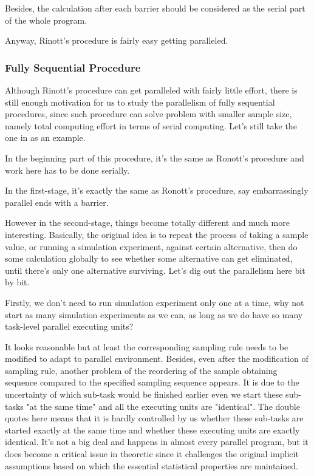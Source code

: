 \documentclass[12pt,a4paper]{report}
\begin{document}
Besides, the calculation after each barrier should be considered as the serial part of the whole program.

Anyway, Rinott's procedure is fairly easy getting paralleled.

\subsubsection{Fully Sequential Procedure}

Although Rinott's procedure can get paralleled with fairly little effort, there is still enough motivation for us to study the parallelism of fully sequential procedures, since such procedure can solve problem with smaller sample size, namely total computing effort in terms of serial computing. Let's still take the one in \cite{ras-seq-jeff} as an example.

In the beginning part of this procedure, it's the same as Ronott's procedure and work here has to be done serially.

In the first-stage, it's exactly the same as Ronott's procedure, say embarrassingly parallel ends with a barrier.

However in the second-stage, things become totally different and much more interesting. Basically, the original idea is to repeat the process of taking a sample value, or running a simulation experiment, against certain alternative, then do some calculation globally to see whether some alternative can get eliminated, until there's only one alternative surviving. Let's dig out the parallelism here bit by bit.

Firstly, we don't need to run simulation experiment only one at a time, why not start as many simulation experiments as we can, as long as we do have so many task-level parallel executing units?

It looks reasonable but at least the corresponding sampling rule needs to be modified to adapt to parallel environment. Besides, even after the modification of sampling rule, another problem of the reordering of the sample obtaining sequence compared to the specified sampling sequence appears. It is due to the uncertainty of which sub-task would be finished earlier even we start these sub-tasks "at the same time" and all the executing units are "identical". The double quotes here means that it is hardly controlled by us whether these sub-tasks are started exactly at the same time and whether these executing units are exactly identical. It's not a big deal and happens in almost every parallel program, but it does become a critical issue in theoretic since it challenges the original implicit assumptions based on which the essential statistical properties are maintained.
\end{document}
